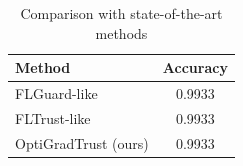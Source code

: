\begin{table}[h]
\centering
\begin{tabular}{lc}
\hline
Method & Accuracy \\
\hline
FLGuard-like & 0.9933 \\
FLTrust-like & 0.9933 \\
OptiGradTrust (ours) & 0.9933 \\
\hline
\end{tabular}
\caption{Comparison with state-of-the-art methods}
\end{table}
